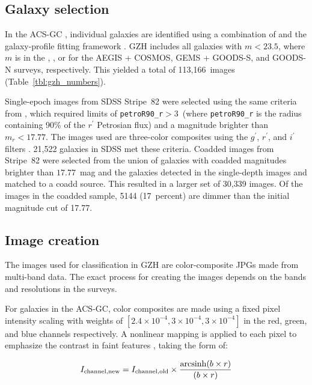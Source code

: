 \documentclass[twocolumn]{aastex6}
\begin{document}
\subsection{Galaxy selection}

In the ACS-GC \citep{gri12}, individual galaxies are identified using a combination of \sextractor{} \citep{ber96} and the galaxy-profile fitting framework \galapagos{} \citep{bar12}. GZH includes all galaxies with $m < 23.5$, where $m$ is in the \Iband, \zband, or \iband{} for the AEGIS + COSMOS, GEMS + GOODS-S, and GOODS-N surveys, respectively. This yielded a total of 113,166~images (Table~\ref{tbl:gzh_numbers}).

Single-epoch images from SDSS Stripe~82 were selected using the same criteria from \citet{wil13}, which required limits of \texttt{petroR90\_r}$ > 3$\arcsec~(where \texttt{petroR90\_r} is the radius containing 90\% of the $r^\prime$ Petrosian flux) and a magnitude brighter than $m_r < 17.77$. The images used are three-color composites using the $g^\prime$, $r^\prime$, and $i^\prime$ filters \citep{nie04}. 21,522 galaxies in SDSS met these criteria. Coadded images from Stripe~82 were selected from the union of galaxies with coadded magnitudes brighter than $17.77$~mag and the galaxies detected in the single-depth images and matched to a coadd source. This resulted in a larger set of 30,339 images. Of the images in the coadded sample, 5144 (17~percent) are dimmer than the initial magnitude cut of 17.77. 

\subsection{Image creation}

The images used for classification in GZH are color-composite JPGs made from multi-band data. The exact process for creating the images depends on the bands and resolutions in the surveys. 

For galaxies in the ACS-GC, color composites are made using a fixed pixel intensity scaling with weights of $[2.4\times10^{-4},3\times10^{-4},3\times10^{-4}]$ in the red, green, and blue channels respectively. A nonlinear mapping is applied to each pixel to emphasize the contrast in faint features \citep{lup04}, taking the form of:

\begin{equation}
I_\mathrm{channel,new} = I_\mathrm{channel,old} \times \frac{\arcsinh(b\times r)}{(b\times r)}
\label{eqn:nonlinear}
\end{equation}
\end{document}
